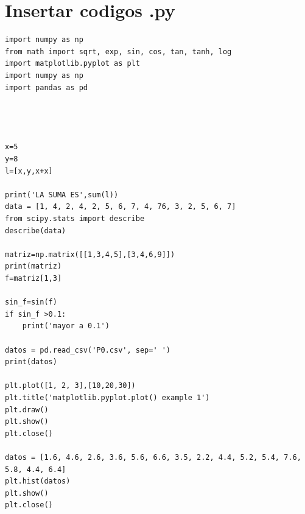\documentclass{article}
\begin{document}
\section{Insertar codigos .py }
\lstset{language=Python}
\lstset{frame=lines}
\lstset{basicstyle=\footnotesize}
\begin{lstlisting}
import numpy as np
from math import sqrt, exp, sin, cos, tan, tanh, log
import matplotlib.pyplot as plt 
import numpy as np
import pandas as pd
    



x=5
y=8
l=[x,y,x+x]

print('LA SUMA ES',sum(l))
data = [1, 4, 2, 4, 2, 5, 6, 7, 4, 76, 3, 2, 5, 6, 7]
from scipy.stats import describe
describe(data)

matriz=np.matrix([[1,3,4,5],[3,4,6,9]])
print(matriz)
f=matriz[1,3]

sin_f=sin(f)
if sin_f >0.1:
    print('mayor a 0.1')
    
datos = pd.read_csv('P0.csv', sep=' ')
print(datos)

plt.plot([1, 2, 3],[10,20,30]) 
plt.title('matplotlib.pyplot.plot() example 1') 
plt.draw() 
plt.show()
plt.close()

datos = [1.6, 4.6, 2.6, 3.6, 5.6, 6.6, 3.5, 2.2, 4.4, 5.2, 5.4, 7.6, 5.8, 4.4, 6.4]
plt.hist(datos)
plt.show()
plt.close()
\end{lstlisting}


\end{document}
